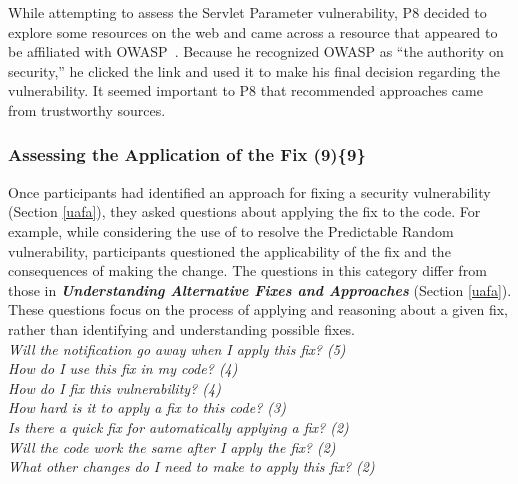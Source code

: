 \documentclass{sig-alternate}
\begin{document}
While attempting to assess the Servlet Parameter vulnerability, P8 decided to explore some resources on the web and came across a resource that appeared to be affiliated with OWASP~\cite{OWASP}. 
Because he recognized OWASP as ``the authority on security,'' he clicked the link and used it to make his final decision regarding the vulnerability. 
It seemed important to P8 that recommended approaches came from trustworthy sources.












\subsubsection{\textbf{Assessing the Application of the Fix (9)\{9\}}}\label{aaf}
Once participants had identified an approach for fixing a security vulnerability (Section \ref{uafa}), they asked questions about applying the fix to the code.
For example, while considering the use of  to resolve the Predictable Random vulnerability, participants questioned the applicability of the fix and the consequences of making the change. 
The questions in this category differ from those in \emph{\textbf{Understanding Alternative Fixes and Approaches}} (Section \ref{uafa}). 
These questions focus on the process of applying  and reasoning about a given fix, rather than identifying and understanding possible fixes.
\\

\noindent\emph{Will the notification go away when I apply this fix? (5)} \\
\emph{How do I use this fix in my code? (4)} \\
\emph{How do I fix this vulnerability? (4)} \\
\emph{How hard is it to apply a fix to this code? (3)} \\
\emph{Is there a quick fix for automatically applying a fix? (2)} \\
\emph{Will the code work the same after I apply the fix? (2)} \\
\emph{What other changes do I need to make to apply this fix? (2)} 
\\
\end{document}
